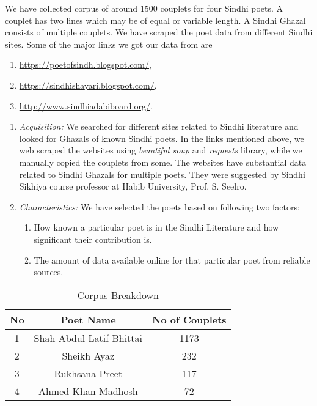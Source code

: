\documentclass[conference]{IEEEtran}
\begin{document}
We have collected corpus of around 1500 couplets for four Sindhi poets. A couplet has two lines which may be of equal or variable length. A Sindhi Ghazal consists of multiple couplets. We have scraped the poet data from different Sindhi sites. Some of the major links we got our data from are 
\begin{enumerate}
    \item \url{https://poetofsindh.blogspot.com/},
    \item \url{https://sindhishayari.blogspot.com/},
    \item \url{http://www.sindhiadabiboard.org/}.
\end{enumerate} 
\par
\begin{enumerate}
    \item \textit{Acquisition:} We searched for different sites related to Sindhi literature and looked for Ghazals of known Sindhi poets. In the links mentioned above, we web scraped the websites using \textit{beautiful soup} and \textit{requests} library, while we manually copied the couplets from some. The websites have substantial data related to Sindhi Ghazals for multiple poets. They were suggested by Sindhi Sikhiya course professor at Habib University, Prof. S. Seelro.  
    \item \textit{Characteristics:} We have selected the poets based on following two factors: 
    \begin{enumerate}
        \item How known a particular poet is in the Sindhi Literature and how significant their contribution is. 
        \item The amount of data available online for that particular poet from reliable sources. 
    \end{enumerate}
    
\end{enumerate}

\begin{table}
\centering
\caption{Corpus Breakdown}
\label{table:corpus}
\begin{tabular}{|c|c|c|}
\hline
\textbf{No} & \textbf{Poet Name} & \textbf{No of Couplets} \\
\hline
1 & Shah Abdul Latif Bhittai & 1173 \\
2 & Sheikh Ayaz & 232 \\
3 & Rukhsana Preet & 117 \\
4 & Ahmed Khan Madhosh & 72 \\

\hline
\end{tabular}
\end{table}
\end{document}

